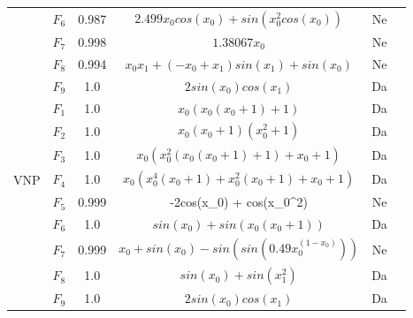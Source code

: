 \documentclass[main.tex]{subfiles}
\begin{document}
\begin{table}
\begin{center}
\begin{tabular}{ |c|c|c|c|c|c| }
& $F_{6}$ & 0.987 & $2.499 x_0 cos(x_0) + sin(x_0^2 cos(x_0))$ & Ne \\
& $F_{7}$ & 0.998 & $1.38067 x_0$ & Ne \\
& $F_{8}$ & 0.994 & $x_0 x_1 + (-x_0 + x_1)sin(x_1) + sin(x_0)$ & Ne \\
& $F_{9}$ & 1.0 & $2sin(x_0)cos(x_1)$ & Da \\
\hline
\multirow{7}{*}{VNP} 
& $F_{1}$ & 1.0 & $x_0(x_0(x_0 + 1) + 1)$ & Da \\
& $F_{2}$ & 1.0 & $x_0(x_0 + 1) (x_0^2 + 1)$ & Da \\
& $F_{3}$ & 1.0 & $x_0(x_0^2(x_0(x_0 + 1) + 1) + x_0 + 1)$ & Da \\
& $F_{4}$ & 1.0 & $x_0(x_0^4(x_0 + 1) + x_0^2(x_0 + 1) + x_0 + 1)$ & Da \\
& $F_{5}$ & 0.999 & -2cos(x_0) + cos(x_0^2) & Ne \\
& $F_{6}$ & 1.0 & $sin(x_0) + sin(x_0(x_0 + 1))$ & Da \\
& $F_{7}$ & 0.999 & $x_0 + sin(x_0) - sin(sin(0.49 x_0^{(1 - x_0)}))$ & Ne \\
& $F_{8}$ & 1.0 & $sin(x_0) + sin(x_1^2)$ & Da \\
& $F_{9}$ & 1.0 & $2sin(x_0)cos(x_1)$ & Da \\
\hline
\end{tabular}
\end{center}
\end{table}
\fi
\end{document}
